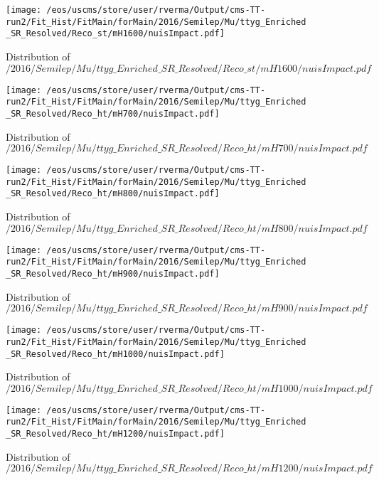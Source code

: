\begin{figure}
\centering
\texttt{[image: /eos/uscms/store/user/rverma/Output/cms-TT-run2/Fit\_Hist/FitMain/forMain/2016/Semilep/Mu/ttyg\_Enriched\_SR\_Resolved/Reco\_st/mH1600/nuisImpact.pdf]}
\caption{Distribution of $/2016/Semilep/Mu/ttyg\_Enriched\_SR\_Resolved/Reco\_st/mH1600/nuisImpact.pdf$}
\end{figure}

\begin{figure}
\centering
\texttt{[image: /eos/uscms/store/user/rverma/Output/cms-TT-run2/Fit\_Hist/FitMain/forMain/2016/Semilep/Mu/ttyg\_Enriched\_SR\_Resolved/Reco\_ht/mH700/nuisImpact.pdf]}
\caption{Distribution of $/2016/Semilep/Mu/ttyg\_Enriched\_SR\_Resolved/Reco\_ht/mH700/nuisImpact.pdf$}
\end{figure}

\begin{figure}
\centering
\texttt{[image: /eos/uscms/store/user/rverma/Output/cms-TT-run2/Fit\_Hist/FitMain/forMain/2016/Semilep/Mu/ttyg\_Enriched\_SR\_Resolved/Reco\_ht/mH800/nuisImpact.pdf]}
\caption{Distribution of $/2016/Semilep/Mu/ttyg\_Enriched\_SR\_Resolved/Reco\_ht/mH800/nuisImpact.pdf$}
\end{figure}

\begin{figure}
\centering
\texttt{[image: /eos/uscms/store/user/rverma/Output/cms-TT-run2/Fit\_Hist/FitMain/forMain/2016/Semilep/Mu/ttyg\_Enriched\_SR\_Resolved/Reco\_ht/mH900/nuisImpact.pdf]}
\caption{Distribution of $/2016/Semilep/Mu/ttyg\_Enriched\_SR\_Resolved/Reco\_ht/mH900/nuisImpact.pdf$}
\end{figure}

\begin{figure}
\centering
\texttt{[image: /eos/uscms/store/user/rverma/Output/cms-TT-run2/Fit\_Hist/FitMain/forMain/2016/Semilep/Mu/ttyg\_Enriched\_SR\_Resolved/Reco\_ht/mH1000/nuisImpact.pdf]}
\caption{Distribution of $/2016/Semilep/Mu/ttyg\_Enriched\_SR\_Resolved/Reco\_ht/mH1000/nuisImpact.pdf$}
\end{figure}

\begin{figure}
\centering
\texttt{[image: /eos/uscms/store/user/rverma/Output/cms-TT-run2/Fit\_Hist/FitMain/forMain/2016/Semilep/Mu/ttyg\_Enriched\_SR\_Resolved/Reco\_ht/mH1200/nuisImpact.pdf]}
\caption{Distribution of $/2016/Semilep/Mu/ttyg\_Enriched\_SR\_Resolved/Reco\_ht/mH1200/nuisImpact.pdf$}
\end{figure}

